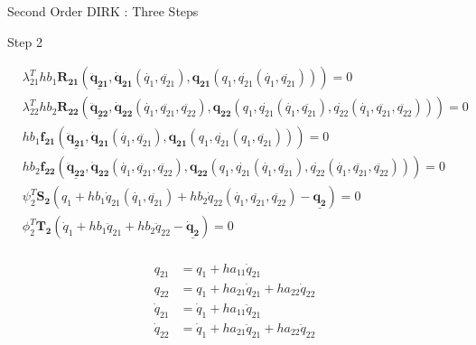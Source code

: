 \documentclass{beamer}
\begin{document}
\begin{frame}[allowframebreaks]{Second Order DIRK : Three Steps}

\tiny{
  \begin{block}{Step 2}
    \begin{minipage}{1.0\textwidth}
      \begin{minipage}{0.7\textwidth}
        \begin{equation}\nonumber
          \begin{split}
            &\lambda_{21}^T h b_1 \mathbf{R_{21}}\left(\underline{\mathbf{\ddot{q}_{21}}},\mathbf{\dot{q}_{21}}(\dot{q_1},\ddot{q_{21}}),\mathbf{{q}_{21}}({q_1},\dot{q_{21}}(\dot{q_1},\ddot{q_{21}}))\right) = 0 \\
            &\lambda_{22}^T h b_2 \mathbf{R_{22}}\left(\underline{\mathbf{\ddot{q}_{22}}},\mathbf{\dot{q}_{22}}(\dot{q_1},\ddot{q_{21}},\ddot{q_{22}}),\mathbf{{q}_{22}}({q_1},\dot{q_{21}}(\dot{q_1},\ddot{q_{21}}),\dot{q_{22}}(\dot{q_1},\ddot{q_{21}},\ddot{q_{22}}))\right) = 0 \\
            &h b_1 \mathbf{f_{21}}\left(\underline{\mathbf{\ddot{q}_{21}}},\mathbf{\dot{q}_{21}}(\dot{q_1},\ddot{q_{21}}),\mathbf{{q}_{21}}({q_1},\dot{q_{21}}(q_1,\ddot{q_{21}}))\right) = 0 \\
            &h b_2 \mathbf{f_{22}}\left(\underline{\mathbf{\ddot{q}_{22}}},\mathbf{\dot{q}_{22}}(\dot{q_1},\ddot{q_{21}},\ddot{q_{22}}),\mathbf{{q}_{22}}({q_1},\dot{q_{21}}(\dot{q_1},\ddot{q_{21}}),\dot{q_{22}}(\dot{q_1},\ddot{q_{21}},\ddot{q_{22}}))\right) = 0 \\
            &\psi_2^T \mathbf{S_2}\left(q_1 + h b_1 \dot{q}_{21}(\dot{q_1},\ddot{q_{21}}) +  h b_2 \dot{q}_{22} (\dot{q_1},\ddot{q_{21}},\ddot{q_{22}}) - \underline{\mathbf{q_2}} \right) = 0\\
            &\phi_2^T \mathbf{T_2}\left(\dot{q}_1 + h b_1 \ddot{q}_{21} +  h b_2 \ddot{q}_{22} - \underline{\mathbf{\dot{q}_2}} \right) = 0 \\
          \end{split}
        \end{equation}
      \end{minipage}
      \begin{minipage}{0.3\textwidth}
        \begin{equation}\nonumber
          \begin{split}
            q_{21} &= q_1 + h a_{11} \dot{q}_{21} \\
            q_{22} &= q_1 + h a_{21} \dot{q}_{21} + h a_{22} \dot{q}_{22} \\
            \dot{q}_{21} &= \dot{q}_1 + h a_{11} \ddot{q}_{21} \\
            \dot{q}_{22} &= \dot{q}_1 + h a_{21} \ddot{q}_{21} + h a_{22} \ddot{q}_{22} \\
          \end{split}
        \end{equation}
      \end{minipage}
    \end{minipage}
  \end{block}

}
\end{frame}
\end{document}
